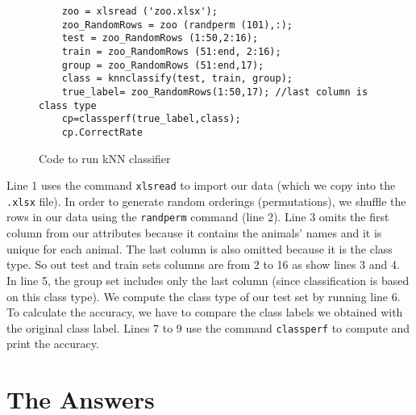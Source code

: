 \documentclass[10pt]{scrartcl}
\begin{document}
\begin{figure}[t]
 \centering
 \begin{verbatim}
    zoo = xlsread ('zoo.xlsx'); 
    zoo_RandomRows = zoo (randperm (101),:); 
    test = zoo_RandomRows (1:50,2:16); 
    train = zoo_RandomRows (51:end, 2:16); 
    group = zoo_RandomRows (51:end,17); 
    class = knnclassify(test, train, group); 
    true_label= zoo_RandomRows(1:50,17); //last column is class type 
    cp=classperf(true_label,class); 
    cp.CorrectRate
 \end{verbatim}
 \caption{Code to run kNN classifier}\label{fig:code}
\end{figure}

Line 1 uses the command \texttt{xlsread} to import our data (which we copy into the \texttt{.xlsx} file).  In order to generate random orderings (permutations), we shuffle the rows in our data using the \texttt{randperm} command (line 2). Line 3 omits the first column from our attributes because it contains the animals' names and it is unique for each animal. The last column is also omitted because it is the class type. So out test and train sets columns are from 2 to 16 as show lines 3 and 4. In line 5, the group set includes only the last column (since classification is based on this class type).  We compute the class type of our test set by running line 6. To calculate the accuracy, we have to compare the class labels we obtained with the original class label. Lines 7 to 9 use the command \texttt{classperf} to compute and print the accuracy.

\section{The Answers}
\end{document}
